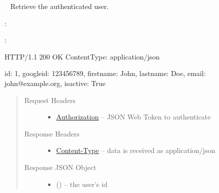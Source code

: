\documentclass[letterpaper,10pt,english]{sphinxmanual}
\begin{document}
\begin{fulllineitems}
\label{\detokenize{resources/user:get--me}}~
Retrieve the authenticated user.

:

\begin{sphinxVerbatim}[commandchars=\\\{\}]
  
 
 
\end{sphinxVerbatim}

:

\begin{sphinxVerbatim}[commandchars=\\\{\}]
HTTP/1.1 200 OK
Content\PYGZhy{}Type: application/json

\PYGZob{}
    \PYGZsq{}id\PYGZsq{}: 1,
    \PYGZsq{}google\PYGZus{}id\PYGZsq{}: \PYGZsq{}123456789\PYGZsq{},
    \PYGZsq{}firstname\PYGZsq{}: \PYGZsq{}John\PYGZsq{},
    \PYGZsq{}lastname\PYGZsq{}: \PYGZsq{}Doe\PYGZsq{},
    \PYGZsq{}email\PYGZsq{}: \PYGZsq{}john@example.org\PYGZsq{},
    \PYGZsq{}is\PYGZus{}active\PYGZsq{}: True
\PYGZcb{}
\end{sphinxVerbatim}
\begin{quote}\begin{description}
\item[{Request Headers}] \leavevmode\begin{itemize}
\item {} 
\href{http://tools.ietf.org/html/rfc7235\#section-4.2}{Authorization} -- JSON Web Token to authenticate

\end{itemize}

\item[{Response Headers}] \leavevmode\begin{itemize}
\item {} 
\href{http://tools.ietf.org/html/rfc7231\#section-3.1.1.5}{Content-Type} -- data is received as application/json

\end{itemize}

\item[{Response JSON Object}] \leavevmode\begin{itemize}
\item {} 
 () -- the user's id


\end{itemize}
\end{description}
\end{quote}
\end{fulllineitems}
\end{document}

